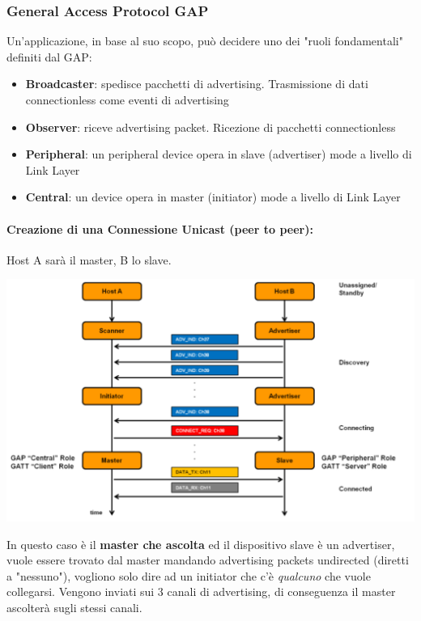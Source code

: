 \newpage

\subsubsection{General Access Protocol GAP}
Un'applicazione, in base al suo scopo, può decidere uno dei "ruoli fondamentali" definiti dal GAP:
\begin{itemize}
	\item \textbf{Broadcaster}: spedisce pacchetti di advertising. Trasmissione di dati connectionless come eventi di advertising
	\item \textbf{Observer}: riceve advertising packet. Ricezione di pacchetti connectionless
	\item \textbf{Peripheral}: un peripheral device opera in slave (advertiser) mode a livello di Link Layer
	\item \textbf{Central}: un device opera in master (initiator) mode a livello di Link Layer
\end{itemize}

\paragraph{Creazione di una Connessione Unicast (peer to peer):} Host A sarà il master, B lo slave.
\begin{center}
	\includegraphics[width=0.98\linewidth]{img/wpan/bleunicast}
\end{center}
In questo caso è il \textbf{master che ascolta} ed il dispositivo slave è un advertiser, vuole essere trovato dal master mandando advertising packets undirected (diretti a "nessuno"), vogliono solo dire ad un initiator che c'è \textit{qualcuno} che vuole collegarsi. Vengono inviati sui 3 canali di advertising, di conseguenza il master ascolterà sugli stessi canali.\\

